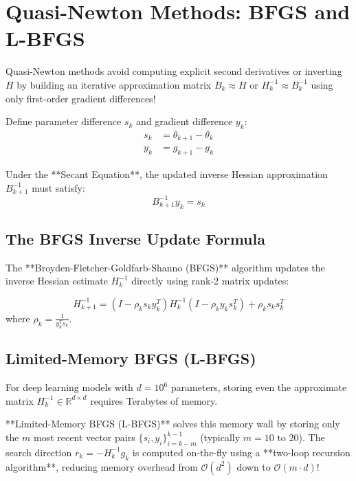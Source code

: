 \section{Quasi-Newton Methods: BFGS and L-BFGS}
Quasi-Newton methods avoid computing explicit second derivatives or inverting $H$ by building an iterative approximation matrix $B_k \approx H$ or $H_k^{-1} \approx B_k^{-1}$ using only first-order gradient differences!

Define parameter difference $s_k$ and gradient difference $y_k$:
\begin{align}
s_k &= \theta_{k+1} - \theta_k \\
y_k &= g_{k+1} - g_k
\end{align}

Under the **Secant Equation**, the updated inverse Hessian approximation $B_{k+1}^{-1}$ must satisfy:
\begin{equation}
B_{k+1}^{-1} y_k = s_k
\end{equation}

\subsection{The BFGS Inverse Update Formula}
The **Broyden-Fletcher-Goldfarb-Shanno (BFGS)** algorithm updates the inverse Hessian estimate $H_k^{-1}$ directly using rank-2 matrix updates:

\begin{equation}
H_{k+1}^{-1} = (I - \rho_k s_k y_k^T) H_k^{-1} (I - \rho_k y_k s_k^T) + \rho_k s_k s_k^T
\end{equation}
where $\rho_k = \frac{1}{y_k^T s_k}$.

\subsection{Limited-Memory BFGS (L-BFGS)}
For deep learning models with $d = 10^6$ parameters, storing even the approximate matrix $H_k^{-1} \in \mathbb{R}^{d \times d}$ requires Terabytes of memory. 

**Limited-Memory BFGS (L-BFGS)** solves this memory wall by storing only the $m$ most recent vector pairs $\{s_i, y_i\}_{i=k-m}^{k-1}$ (typically $m = 10$ to $20$). The search direction $r_k = -H_k^{-1} g_k$ is computed on-the-fly using a **two-loop recursion algorithm**, reducing memory overhead from $\mathcal{O}(d^2)$ down to $\mathcal{O}(m \cdot d)$!


